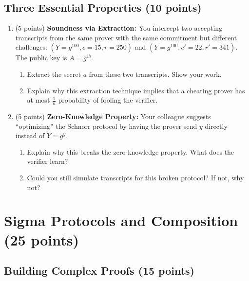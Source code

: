 \documentclass[10pt,a4paper,american]{exam}
\begin{document}
\subsection{Three Essential Properties (10 points)}

\begin{enumerate}
	\item (5 points) \textbf{Soundness via Extraction:}
	      You intercept two accepting transcripts from the same prover with the same commitment but different challenges: $(Y = g^{100}, c = 15, r = 250)$ and $(Y = g^{100}, c' = 22, r' = 341)$. The public key is $A = g^{17}$.
	      \begin{enumerate}
		      \item Extract the secret $a$ from these two transcripts. Show your work.
		      \item Explain why this extraction technique implies that a cheating prover has at most $\frac{1}{n}$ probability of fooling the verifier.
	      \end{enumerate}
	\item (5 points) \textbf{Zero-Knowledge Property:}
	      Your colleague suggests ``optimizing'' the Schnorr protocol by having the prover send $y$ directly instead of $Y = g^y$.
	      \begin{enumerate}
		      \item Explain why this breaks the zero-knowledge property. What does the verifier learn?
		      \item Could you still simulate transcripts for this broken protocol? If not, why not?
	      \end{enumerate}
\end{enumerate}

\section{Sigma Protocols and Composition (25 points)}

\subsection{Building Complex Proofs (15 points)}
\end{document}
